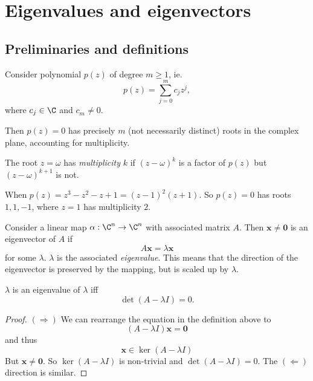 \documentclass[a4paper]{article}
\begin{document}
    \section{Eigenvalues and eigenvectors}
    \subsection{Preliminaries and definitions}
    \begin{thm}
      Consider polynomial $p(z)$ of degree $m \geq 1$, ie.
      \[
        p(z) = \sum_{j = 0}^m c_jz^j,
      \]
      where $c_j\in \C$ and $c_m \not= 0$.

      Then $p(z) = 0$ has precisely $m$ (not necessarily distinct) roots in the complex plane, accounting for multiplicity.
    \end{thm}

    \begin{defi}
      The root $z = \omega$ has \emph{multiplicity} $k$ if $(z - \omega)^k$ is a factor of $p(z)$ but $(z - \omega)^{k + 1}$ is not.
    \end{defi}

    \begin{eg}
      When $p(z) = z^3 - z^2 - z + 1 = (z - 1)^2(z + 1)$. So $p(z) = 0$ has roots $1, 1, -1$, where $z = 1$ has multiplicity $2$.
    \end{eg}

    \begin{defi}
      Consider a linear map $\alpha: \C^n\to \C^n$ with associated matrix $A$. Then $\mathbf{x}\not= \mathbf{0}$ is an eigenvector of $A$ if
      \[
        A\mathbf{x} = \lambda\mathbf{x}
      \]
      for some $\lambda$. $\lambda$ is the associated \emph{eigenvalue}. This means that the direction of the eigenvector is preserved by the mapping, but is scaled up by $\lambda$.
    \end{defi}

    \begin{thm}
      $\lambda$ is an eigenvalue of $\lambda$ iff
      \[
        \det(A - \lambda I) = 0.
      \]
    \end{thm}

    \begin{proof}
      $(\Rightarrow)$ We can rearrange the equation in the definition above to
      \[
        (A - \lambda I)\mathbf{x} = \mathbf{0}
      \]
      and thus
      \[
        \mathbf{x}\in \ker(A - \lambda I)
      \]
      But $\mathbf{x}\not= \mathbf{0}$. So $\ker(A - \lambda I)$ is non-trivial and $\det(A - \lambda I) = 0$. The $(\Leftarrow)$ direction is similar. 
    \end{proof}
\end{document}

